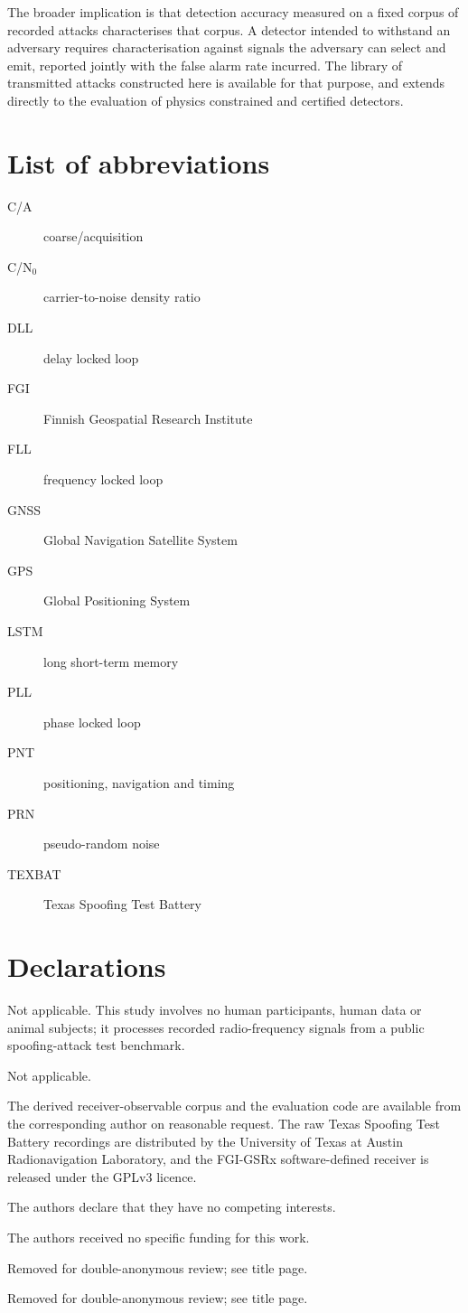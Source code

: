 \documentclass[pdflatex,sn-basic]{sn-jnl}
\theoremstyle{thmstyleone}
\theoremstyle{thmstyletwo}
\theoremstyle{thmstylethree}
\begin{document}
The broader implication is that detection accuracy measured on a fixed corpus of recorded
attacks characterises that corpus. A detector intended to withstand an adversary requires
characterisation against signals the adversary can select and emit, reported jointly with
the false alarm rate incurred. The library of transmitted attacks constructed here is
available for that purpose, and extends directly to the evaluation of physics constrained
and certified detectors.


\backmatter

\section*{List of abbreviations}
\begin{description}
\item[C/A] coarse/acquisition
\item[C/N$_0$] carrier-to-noise density ratio
\item[DLL] delay locked loop
\item[FGI] Finnish Geospatial Research Institute
\item[FLL] frequency locked loop
\item[GNSS] Global Navigation Satellite System
\item[GPS] Global Positioning System
\item[LSTM] long short-term memory
\item[PLL] phase locked loop
\item[PNT] positioning, navigation and timing
\item[PRN] pseudo-random noise
\item[TEXBAT] Texas Spoofing Test Battery
\end{description}

\section*{Declarations}

Not applicable. This study involves no human participants, human data or animal
subjects; it processes recorded radio-frequency signals from a public spoofing-attack
test benchmark.

Not applicable.

The derived receiver-observable corpus and the evaluation code are available from the
corresponding author on reasonable request. The raw Texas Spoofing Test Battery
recordings are distributed by the University of Texas at Austin Radionavigation
Laboratory, and the FGI-GSRx software-defined receiver is released under the GPLv3
licence.

The authors declare that they have no competing interests.

The authors received no specific funding for this work.

Removed for double-anonymous review; see title page.

Removed for double-anonymous review; see title page.


\end{document}
